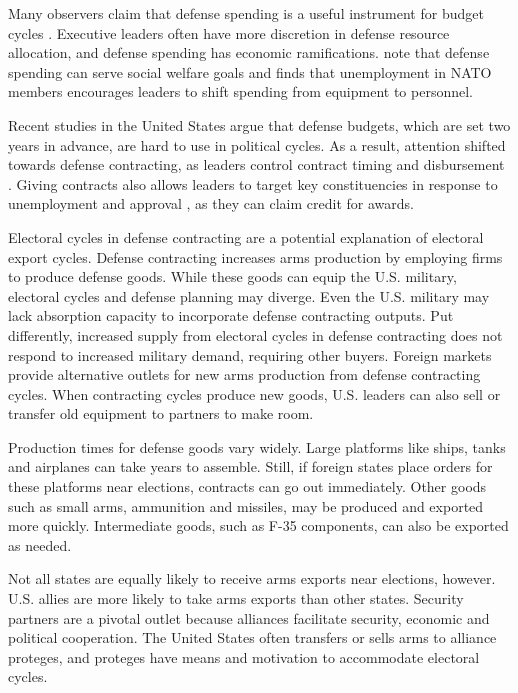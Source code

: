 \documentclass[12pt]{article}
\begin{document}
Many observers claim that defense spending is a useful instrument for budget cycles \citep{Tufte1978, Mintz1988}.
Executive leaders often have more discretion in defense resource allocation, and defense spending has economic ramifications.
\citet{WhittenWilliams2011} note that defense spending can serve social welfare goals and \citet{Becker2021} finds that unemployment in NATO members encourages leaders to shift spending from equipment to personnel.


Recent studies in the United States argue that defense budgets, which are set two years in advance, are hard to use in political cycles.
As a result, attention shifted towards defense contracting, as leaders control contract timing and disbursement \citep{Mayer1995, DerouenHeo2000}.
Giving contracts also allows leaders to target key constituencies in response to unemployment and approval \citep{DerouenHeo2000}, as they can claim credit for awards. 


Electoral cycles in defense contracting are a potential explanation of electoral export cycles.
Defense contracting increases arms production by employing firms to produce defense goods. 
While these goods can equip the U.S. military, electoral cycles and defense planning may diverge.
Even the U.S. military may lack absorption capacity to incorporate defense contracting outputs.
Put differently, increased supply from electoral cycles in defense contracting does not respond to increased military demand, requiring other buyers. 
Foreign markets provide alternative outlets for new arms production from defense contracting cycles. 
When contracting cycles produce new goods, U.S. leaders can also sell or transfer old equipment to partners to make room.


Production times for defense goods vary widely.
Large platforms like ships, tanks and airplanes can take years to assemble. 
Still, if foreign states place orders for these platforms near elections, contracts can go out immediately.
Other goods such as small arms, ammunition and missiles, may be produced and exported more quickly. 
Intermediate goods, such as F-35 components, can also be exported as needed. 


Not all states are equally likely to receive arms exports near elections, however. 
U.S. allies are more likely to take arms exports than other states. 
Security partners are a pivotal outlet because alliances facilitate security, economic and political cooperation.
The United States often transfers or sells arms to alliance proteges, and proteges have means and motivation to accommodate electoral cycles. 
\end{document}
